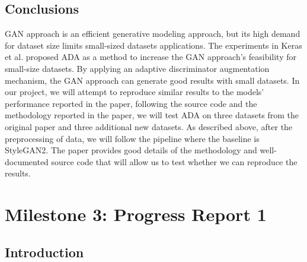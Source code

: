 \documentclass{report}
\begin{document}
\section{Conclusions}

GAN approach is an efficient generative modeling approach, but its high demand for dataset size limits small-sized datasets applications. The experiments in Keras et al. proposed ADA as a method to increase the GAN approach's feasibility for small-size datasets. By applying an adaptive discriminator augmentation mechanism, the GAN approach can generate good results with small datasets. In our project, we will attempt to reproduce similar results to the models' performance reported in the paper, following the source code and the methodology reported in the paper, we will test ADA on three datasets from the original paper and three additional new datasets. As described above, after the preprocessing of data, we will follow the pipeline where the baseline is StyleGAN2. The paper provides good details of the methodology and well-documented source code that will allow us to test whether we can reproduce the results.












\chapter{Milestone 3: Progress Report 1}

\section{Introduction}
\label{sec:M3-intro}
\end{document}
